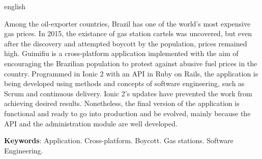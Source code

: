 \begin{resumo}[Abstract]
 \begin{otherlanguage*}{english}

     Among the oil-exporter countries, Brazil has one of the world's most expensive gas prices. In 2015, the existance of gas station cartels was uncovered, but even after the discovery and attempted boycott by the population, prices remained high. Guimifiu is a cross-platform application implemented with the aim of encouraging the Brazilian population to protest against abusive fuel prices in the country. Programmed in Ionic 2 with an API in Ruby on Rails, the application is being developed using methods and concepts of software engineering, such as Scrum and continuous delivery. Ionic 2's updates have prevented the work from achieving desired results. Nonetheless, the final version of the application is functional and ready to go into production and be evolved, mainly because the API and the administration module are well developed.
     \vspace{\onelineskip}
        
     \noindent
     \textbf{Keywords}: Application. Cross-platform. Boycott. Gas stations. Software Engineering. 
 \end{otherlanguage*}
\end{resumo}
